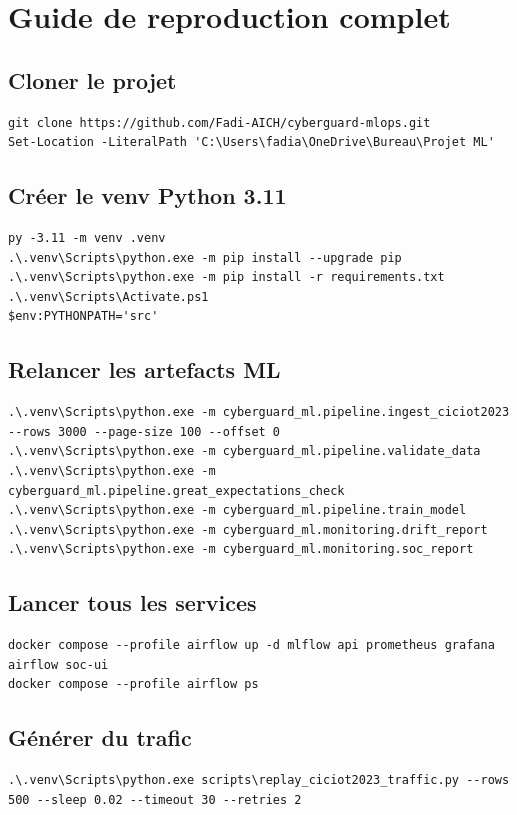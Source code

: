 \chapter{Guide de reproduction complet}

\section{Cloner le projet}
\begin{lstlisting}
git clone https://github.com/Fadi-AICH/cyberguard-mlops.git
Set-Location -LiteralPath 'C:\Users\fadia\OneDrive\Bureau\Projet ML'
\end{lstlisting}

\section{Créer le venv Python 3.11}
\begin{lstlisting}
py -3.11 -m venv .venv
.\.venv\Scripts\python.exe -m pip install --upgrade pip
.\.venv\Scripts\python.exe -m pip install -r requirements.txt
.\.venv\Scripts\Activate.ps1
$env:PYTHONPATH='src'
\end{lstlisting}

\section{Relancer les artefacts ML}
\begin{lstlisting}
.\.venv\Scripts\python.exe -m cyberguard_ml.pipeline.ingest_ciciot2023 --rows 3000 --page-size 100 --offset 0
.\.venv\Scripts\python.exe -m cyberguard_ml.pipeline.validate_data
.\.venv\Scripts\python.exe -m cyberguard_ml.pipeline.great_expectations_check
.\.venv\Scripts\python.exe -m cyberguard_ml.pipeline.train_model
.\.venv\Scripts\python.exe -m cyberguard_ml.monitoring.drift_report
.\.venv\Scripts\python.exe -m cyberguard_ml.monitoring.soc_report
\end{lstlisting}

\section{Lancer tous les services}
\begin{lstlisting}
docker compose --profile airflow up -d mlflow api prometheus grafana airflow soc-ui
docker compose --profile airflow ps
\end{lstlisting}

\section{Générer du trafic}
\begin{lstlisting}
.\.venv\Scripts\python.exe scripts\replay_ciciot2023_traffic.py --rows 500 --sleep 0.02 --timeout 30 --retries 2
\end{lstlisting}

